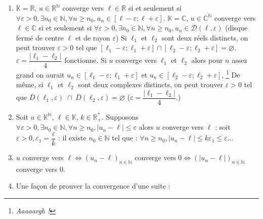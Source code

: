 \documentclass[12pt,a4paper]{report}
\begin{document}
\begin{remarque}[Remarques]
\begin{enumerate}
\item $\mathbb{K}=\mathbb{R}$, $u \in \mathbb{R}^\mathbb{N}$ converge vers $\ell \in \mathbb{R}$ si et seulement si \newline $\forall \varepsilon > 0, \exists n_0 \in \mathbb{N}, \forall n \geq n_0, u_n \in \left[\ell - \varepsilon ; \ell + \varepsilon \right]$.
\newline \newline $\mathbb{K}=\mathbb{C}$, $u \in \mathbb{C}^\mathbb{N}$ converge vers $\ell \in \mathbb{C}$ si et seulement si \newline $\forall \varepsilon > 0, \exists n_0 \in \mathbb{N}, \forall n \geq  n_0, u_n \in \overline{\mathcal{D}}(\ell, \varepsilon)$ (disque fermé de centre $\ell$ et de rayon $\varepsilon$)
\newline \newline Si $\ell_1$ et $\ell_2$ sont deux réels distincts, on peut trouver $\varepsilon > 0$ tel que $\left[\ell_1-\varepsilon;\ell_1+\varepsilon\right] \cap \left[\ell_2-\varepsilon;\ell_2+\varepsilon\right] = \varnothing$.
\newline $\varepsilon = \dfrac{\lvert \ell_1-\ell_2\rvert}{4}$ fonctionne. Si $u$ converge vers $\ell_1$ et $\ell_2$ alors pour $n$ assez grand on aurait 
\newline $u_n \in \left[\ell_1-\varepsilon;\ell_1+\varepsilon\right]$ et $u_n \in \left[\ell_2-\varepsilon;\ell_2+\varepsilon\right]$, \footnote{\emph{Aaaaargh !}}
\newline De même, si $\ell_1$ et $\ell_2$ sont deux complexes distincts, on peut trouver $\varepsilon > 0$ tel que \newline $\overline{D}(\ell_1,\varepsilon)  \; \cap \; \overline{D}(\ell_2,\varepsilon) = \varnothing$ \quad ($\varepsilon = \dfrac{\lvert \ell_1 - \ell_2 \rvert}{4}$.)
\item Soit $u \in \mathbb{K}^\mathbb{N}$, $\ell \in \mathbb{K}$, $k \in \mathbb{R}^*_+$. Supposons $\forall \varepsilon > 0, \exists n_0 \in \mathbb{N}, \forall n \geq n_0, \lvert u_n - \ell \rvert \leq \varepsilon$
\newline alors $u$ converge vers $\ell$ : soit $\varepsilon > 0, \varepsilon_1 = \dfrac{\varepsilon}{k}$ : il existe $n_0 \in \mathbb{N}$ tel que : $\forall n \geq n_0, \lvert u_n-\ell \rvert \leq k\varepsilon_1 \leq \varepsilon$...
\item $u$ converge vers $\ell \Longleftrightarrow (u_n-\ell)_{n \in \mathbb{N}}$ converge vers $0 \Longleftrightarrow (\lvert u_n - \ell\rvert)_{n \in \mathbb{N}}$ converge vers $0$.
\item Une façon de prouver la convergence d'une suite :


\end{enumerate}
\end{remarque}
\end{document}
